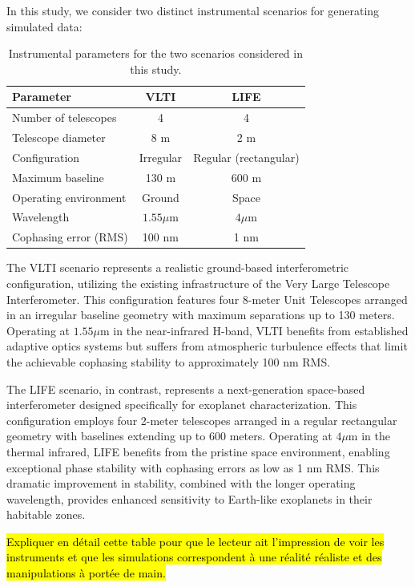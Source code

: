 \documentclass{article}
\begin{document}
In this study, we consider two distinct instrumental scenarios for generating simulated data:

\begin{table}[H]
\centering
\begin{tabular}{|l|c|c|}
\hline
\textbf{Parameter} & \textbf{VLTI} & \textbf{LIFE} \\
\hline
Number of telescopes & 4 & 4 \\
Telescope diameter & 8 m & 2 m \\
Configuration & Irregular & Regular (rectangular) \\
Maximum baseline & 130 m & 600 m \\
Operating environment & Ground & Space \\
Wavelength & $1.55\mu$m & $4\mu$m \\
Cophasing error (RMS) & 100 nm & 1 nm \\
\hline
\end{tabular}
\caption{Instrumental parameters for the two scenarios considered in this study.}
\label{tab:scenarios}
\end{table}

The VLTI scenario represents a realistic ground-based interferometric configuration, utilizing the existing infrastructure of the Very Large Telescope Interferometer. This configuration features four 8-meter Unit Telescopes arranged in an irregular baseline geometry with maximum separations up to 130 meters. Operating at $1.55\mu$m in the near-infrared H-band, VLTI benefits from established adaptive optics systems but suffers from atmospheric turbulence effects that limit the achievable cophasing stability to approximately 100 nm RMS.

The LIFE scenario, in contrast, represents a next-generation space-based interferometer designed specifically for exoplanet characterization. This configuration employs four 2-meter telescopes arranged in a regular rectangular geometry with baselines extending up to 600 meters. Operating at $4\mu$m in the thermal infrared, LIFE benefits from the pristine space environment, enabling exceptional phase stability with cophasing errors as low as 1 nm RMS. This dramatic improvement in stability, combined with the longer operating wavelength, provides enhanced sensitivity to Earth-like exoplanets in their habitable zones.

\hl{Expliquer en détail cette table pour que le lecteur ait l'impression de voir les instruments et que les simulations correspondent à une réalité réaliste et des manipulations à portée de main.}
\end{document}
